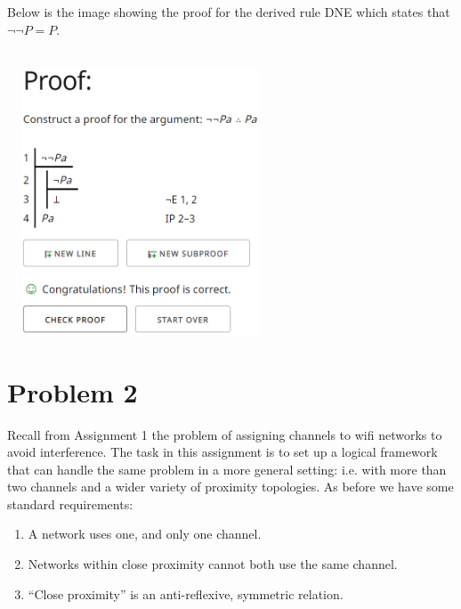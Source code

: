 \documentclass{article}
\begin{document}
\begin{flushleft}
Below is the image showing the proof for the derived rule DNE which states that $\neg\neg P = P$.\\
\begin{centering}\hspace*{1pt}\\\includegraphics[width=300px, height = 300px]{p1.png}\end{centering}
\end{flushleft}
\newpage
\section{Problem 2}
Recall from Assignment 1 the problem of assigning channels to wifi networks to avoid interference. The
task in this assignment is to set up a logical framework that can handle the same problem in a more
general setting: i.e. with more than two channels and a wider variety of proximity topologies. As before we have some standard requirements:
    \begin{enumerate}[I]
        \item A network uses one, and only one channel.
        \item Networks within close proximity cannot both use the same channel.
        \item “Close proximity” is an anti-reflexive, symmetric relation.
    \end{enumerate}
\end{document}
